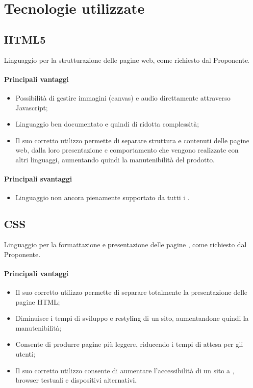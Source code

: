 \documentclass[../PianoDiQualifica.tex]{subfiles}
\begin{document}
	\section{Tecnologie utilizzate}
		\subsection{HTML5}
			Linguaggio per la strutturazione delle pagine web, come richiesto dal Proponente.
			\paragraph{Principali vantaggi}
				\begin{itemize}
					\item Possibilità di gestire immagini (canvas) e audio direttamente
					attraverso Javascript;
					\item Linguaggio ben documentato e quindi di ridotta complessità;
					\item Il suo corretto utilizzo permette di separare struttura e contenuti delle
					pagine web,	dalla loro presentazione e comportamento che vengono realizzate con
					altri linguaggi, aumentando quindi la manutenibilità del prodotto.
				\end{itemize}
			\paragraph{Principali svantaggi}
				\begin{itemize}
					\item Linguaggio non ancora	pienamente supportato da tutti i .
				\end{itemize}
		\subsection{CSS}
			Linguaggio per la formattazione e presentazione delle pagine , come richiesto dal
			Proponente.
			\paragraph{Principali vantaggi}
			\begin{itemize}
					\item Il suo corretto utilizzo permette di separare totalmente la presentazione
					delle pagine HTML;
					\item Diminuisce i tempi di sviluppo e restyling di un sito, aumentandone quindi
					la manutenibilità;
					\item Consente di produrre pagine più leggere, riducendo i tempi di attesa per
					gli utenti;
					\item Il suo corretto utilizzo consente di aumentare l'accessibilità di un sito
					a , browser testuali e dispositivi alternativi.
				\end{itemize}
\end{document}
